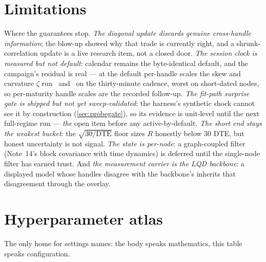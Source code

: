 \documentclass[11pt]{article}
\begin{document}
\section{Limitations}
\label{sec:limits}

Where the guarantees stop.  \emph{The diagonal update discards genuine
cross-handle information}; the blow-up showed why that trade is
currently right, and a shrunk-correlation update is a live research
item, not a closed door.  \emph{The session clock is measured but not
default}: calendar remains the byte-identical default, and the
campaign's residual is real --- at the default per-handle scales the
skew and curvature $\zeta$ run \ktrzsesskew\ and \ktrzsescurv\ on the
thirty-minute
cadence, worst on short-dated nodes, so per-maturity handle scales are
the recorded follow-up.  \emph{The fit-path surprise gate is shipped
but not yet sweep-validated}: the harness's synthetic shock cannot see
it by construction (\cref{sec:probegate}), so its evidence is
unit-level until the next full-regime run --- \emph{the} open item
before any active-by-default.  \emph{The short end stays the weakest
bucket}: the $\sqrt{30/\mathrm{DTE}}$ floor sizes $R$ honestly below
$30$ DTE, but honest uncertainty is not signal.  \emph{The state is
per-node}: a graph-coupled filter (Note~14's block covariance with
time dynamics) is deferred until the single-node filter has earned
trust.  And \emph{the measurement carrier is the LQD backbone}: a
displayed model whose handles disagree with the backbone's inherits
that disagreement through the overlay.

\appendix
\section{Hyperparameter atlas}
\label{app:atlas}

The only home for settings names: the body speaks mathematics, this
table speaks configuration.
\end{document}
